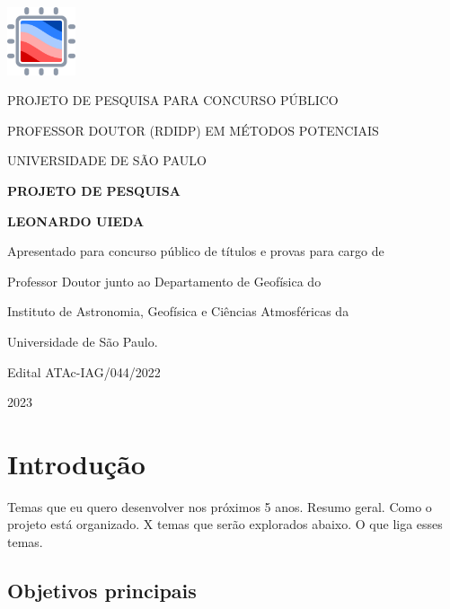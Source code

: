 \documentclass[11pt,a4paper,oneside]{book}
\newcommand{\Year}{2023}
\newcommand{\Author}{Leonardo Uieda}
\begin{document}
\pagestyle{plain}
\frontmatter

\begin{titlepage}
  \begin{center}
    \includegraphics[height=2cm]{images/logo.pdf}
    \vspace{1cm}

    PROJETO DE PESQUISA PARA CONCURSO PÚBLICO

    PROFESSOR DOUTOR (RDIDP) EM MÉTODOS POTENCIAIS

    UNIVERSIDADE DE SÃO PAULO
    \vspace{5cm}

    \textbf{\LARGE PROJETO DE PESQUISA}
    \vspace{1cm}

    \textbf{\LARGE \MakeUppercase{\Author{}}}
    \vspace{5cm}

    {\small
      Apresentado para concurso público de títulos e provas para cargo de

      Professor Doutor junto ao Departamento de Geofísica do

      Instituto de Astronomia, Geofísica e Ciências Atmosféricas da

      Universidade de São Paulo.
      \vspace{1cm}

      Edital ATAc-IAG/044/2022
    }
    \vfill

    \Year{}
  \end{center}
\end{titlepage}

\tableofcontents

\mainmatter
\pagestyle{fancy}

\chapter{Introdução}

Temas que eu quero desenvolver nos próximos 5 anos.
Resumo geral.
Como o projeto está organizado.
X temas que serão explorados abaixo.
O que liga esses temas.

\section{Objetivos principais}
\end{document}
